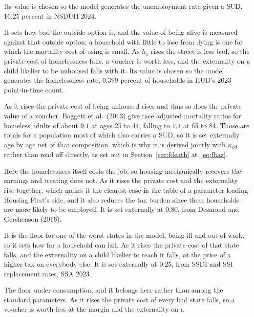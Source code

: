 \documentclass[10pt]{article}
\begin{document}
\begin{description}
Its value is chosen so the model
generates the unemployment rate given a SUD, $16.25$ percent in NSDUH 2024.
\item[$h_1$, the service flow of homelessness.] It sets how bad the outside option
is, and the value of being alive is measured against that outside option: a
household with little to lose from dying is one for which the mortality cost of
using is small. As $h_1$ rises the street is less bad, so the private
cost of homelessness falls, a voucher is worth less, and the externality on a child
likelier to be unhoused falls with it. Its value is chosen so the model generates the
homelessness rate, $0.399$ percent of households in HUD's 2023 point-in-time count.
\item[$\kappa_{\phi H}(j)$, mortality when homeless.] As it rises the
private cost of being unhoused rises and thus so does the private value
of a voucher. Baggett et al.\ (2013) give race
adjusted mortality ratios for homeless adults of about $9.1$ at ages 25 to 44,
falling to $1.1$ at 65 to 84. Those are totals for a population most of which also
carries a SUD, so it is set externally age by age net of that composition, which is
why it is derived jointly with $\bar\kappa_{\phi d}$ rather than read off directly,
as set out in Section~\ref{sec:fdeath} at~\eqref{eq:fhaz}.
\item[$\kappa_{ueH}$, employment lost to homelessness.] Here the homelessness
itself costs the job, so housing mechanically recovers the earnings and treating
does not. As it rises the private cost and the externality rise
together, which makes it the clearest case in
the table of a parameter loading Housing First's side, and it also
reduces the tax burden since these households are more likely to be employed. It is set externally at
$0.80$, from Desmond and Gershenson (2016).
\item[$\zeta_{DI}$, the disability transfer for the non employed with SMI.] It is
the floor for one of the worst states in the model, being ill and out of work, so it sets
how far a household can fall. As it rises the private cost of that
state falls, and the externality on a child likelier to reach it falls, at the price
of a higher tax on everybody else. It is set externally at $0.25$,
from SSDI and SSI replacement rates, SSA 2023.
\item[$\underline c$, the food stamp consumption floor.]
The floor under consumption, and it belongs here rather than among the
standard parameters. As it rises the private cost of every bad
state falls, so a voucher is worth less at the margin and the externality on a

\end{description}
\end{document}
